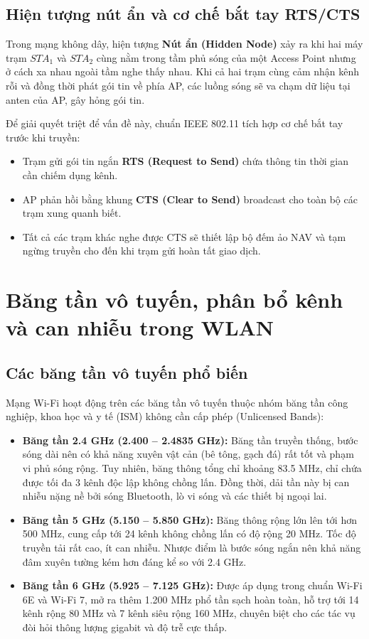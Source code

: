 \subsection{Hiện tượng nút ẩn và cơ chế bắt tay RTS/CTS}

Trong mạng không dây, hiện tượng \textbf{Nút ẩn (Hidden Node)} xảy ra khi hai máy trạm $STA_1$ và $STA_2$ cùng nằm trong tầm phủ sóng của một Access Point nhưng ở cách xa nhau ngoài tầm nghe thấy nhau. Khi cả hai trạm cùng cảm nhận kênh rỗi và đồng thời phát gói tin về phía AP, các luồng sóng sẽ va chạm dữ liệu tại anten của AP, gây hỏng gói tin.

Để giải quyết triệt để vấn đề này, chuẩn IEEE 802.11 tích hợp cơ chế bắt tay trước khi truyền:
\begin{itemize}
    \item Trạm gửi gói tin ngắn \textbf{RTS (Request to Send)} chứa thông tin thời gian cần chiếm dụng kênh.
    \item AP phản hồi bằng khung \textbf{CTS (Clear to Send)} broadcast cho toàn bộ các trạm xung quanh biết.
    \item Tất cả các trạm khác nghe được CTS sẽ thiết lập bộ đếm ảo NAV và tạm ngừng truyền cho đến khi trạm gửi hoàn tất giao dịch.
\end{itemize}

\section{Băng tần vô tuyến, phân bổ kênh và can nhiễu trong WLAN}

\subsection{Các băng tần vô tuyến phổ biến}

Mạng Wi-Fi hoạt động trên các băng tần vô tuyến thuộc nhóm băng tần công nghiệp, khoa học và y tế (ISM) không cần cấp phép (Unlicensed Bands):
\begin{itemize}
    \item \textbf{Băng tần 2.4 GHz (2.400 -- 2.4835 GHz):} Băng tần truyền thống, bước sóng dài nên có khả năng xuyên vật cản (bê tông, gạch đá) rất tốt và phạm vi phủ sóng rộng. Tuy nhiên, băng thông tổng chỉ khoảng 83.5 MHz, chỉ chứa được tối đa 3 kênh độc lập không chồng lấn. Đồng thời, dải tần này bị can nhiễu nặng nề bởi sóng Bluetooth, lò vi sóng và các thiết bị ngoại lai.
    \item \textbf{Băng tần 5 GHz (5.150 -- 5.850 GHz):} Băng thông rộng lớn lên tới hơn 500 MHz, cung cấp tới 24 kênh không chồng lấn có độ rộng 20 MHz. Tốc độ truyền tải rất cao, ít can nhiễu. Nhược điểm là bước sóng ngắn nên khả năng đâm xuyên tường kém hơn đáng kể so với 2.4 GHz.
    \item \textbf{Băng tần 6 GHz (5.925 -- 7.125 GHz):} Được áp dụng trong chuẩn Wi-Fi 6E và Wi-Fi 7, mở ra thêm 1.200 MHz phổ tần sạch hoàn toàn, hỗ trợ tới 14 kênh rộng 80 MHz và 7 kênh siêu rộng 160 MHz, chuyên biệt cho các tác vụ đòi hỏi thông lượng gigabit và độ trễ cực thấp.
\end{itemize}

